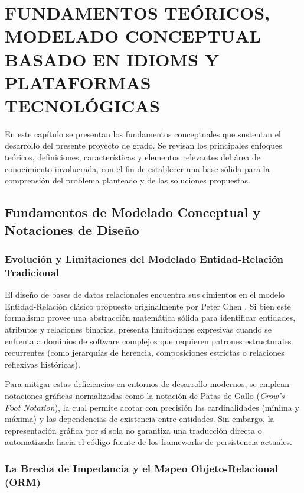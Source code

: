 \chapter{FUNDAMENTOS TEÓRICOS, MODELADO CONCEPTUAL BASADO EN IDIOMS Y PLATAFORMAS TECNOLÓGICAS}
\label{cap:marco-teorico}
En este capítulo se presentan los fundamentos conceptuales que sustentan el desarrollo del presente proyecto de grado. Se revisan los principales enfoques teóricos, definiciones, características y elementos relevantes del área de conocimiento involucrada, con el fin de establecer una base sólida para la comprensión del problema planteado y de las soluciones propuestas.

\section{Fundamentos de Modelado Conceptual y Notaciones de Diseño}
\label{sec:modelado-conceptual}

\subsection{Evolución y Limitaciones del Modelado Entidad-Relación Tradicional}
\label{subsec:evolucion-er}

El diseño de bases de datos relacionales encuentra sus cimientos en el modelo Entidad-Relación clásico propuesto originalmente por Peter Chen \cite{chen1976entity}. Si bien este formalismo provee una abstracción matemática sólida para identificar entidades, atributos y relaciones binarias, presenta limitaciones expresivas cuando se enfrenta a dominios de software complejos que requieren patrones estructurales recurrentes (como jerarquías de herencia, composiciones estrictas o relaciones reflexivas históricas).

Para mitigar estas deficiencias en entornos de desarrollo modernos, se emplean notaciones gráficas normalizadas como la notación de Patas de Gallo (\textit{Crow's Foot Notation}), la cual permite acotar con precisión las cardinalidades (mínima y máxima) y las dependencias de existencia entre entidades. Sin embargo, la representación gráfica por sí sola no garantiza una traducción directa o automatizada hacia el código fuente de los frameworks de persistencia actuales.

\subsection{La Brecha de Impedancia y el Mapeo Objeto-Relacional (ORM)}
\label{subsec:brecha-impedancia}

